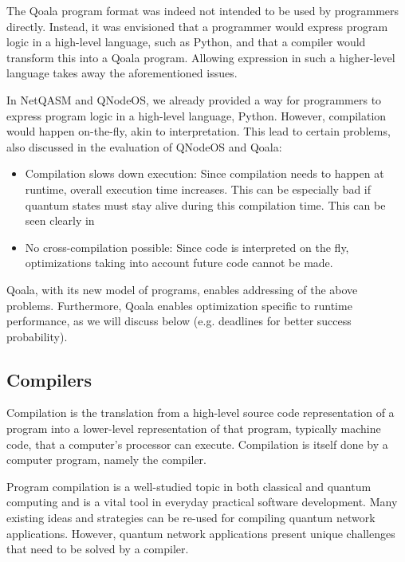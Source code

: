 The Qoala program format was indeed not intended to be used by programmers directly.
Instead, it was envisioned that a programmer would express program logic in a high-level language, such as Python, and that a compiler would transform this into a Qoala program.
Allowing expression in such a higher-level language takes away the aforementioned issues.


In NetQASM and QNodeOS, we already provided a way for programmers to express program logic in a high-level language, Python.
However, compilation would happen on-the-fly, akin to interpretation.
This lead to certain problems, also discussed in the evaluation of QNodeOS and Qoala:
\begin{itemize}
  \item Compilation slows down execution:
    Since compilation needs to happen at runtime, overall execution time increases.
    This can be especially bad if quantum states must stay alive during this compilation time.
    This can be seen clearly in 
  \item No cross-compilation possible:
    Since code is interpreted on the fly, optimizations taking into account future code cannot be made. 
\end{itemize}

Qoala, with its new model of programs, enables addressing of the above problems.
Furthermore, Qoala enables optimization specific to runtime performance, as we will discuss below (e.g. deadlines for better success probability).


\subsection{Compilers}
Compilation is the translation from a high-level source code representation of a program into a lower-level representation of that program, typically machine code, that a computer's processor can execute.
Compilation is itself done by a computer program, namely the compiler.

Program compilation is a well-studied topic in both classical and quantum computing and is a vital tool in everyday practical software development.
Many existing ideas and strategies can be re-used for compiling quantum network applications.
However, quantum network applications present unique challenges that need to be solved by a compiler.

